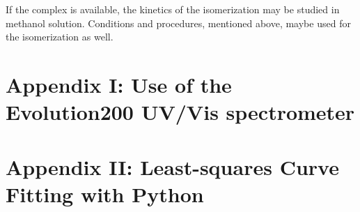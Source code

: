 If the \iupac{\cis-} complex is available, the kinetics of the \iupac{\cis-\trans} isomerization may be studied in methanol solution. 
Conditions and procedures, mentioned above, maybe used for the \iupac{\cis-\trans} isomerization as well.

\section{Appendix I: Use of the Evolution200 UV/Vis spectrometer}
\label{sec:uv-vis_instructions}



\section{Appendix II: Least-squares Curve Fitting with Python}
\label{sec:least-squares_fitting_in_python}

